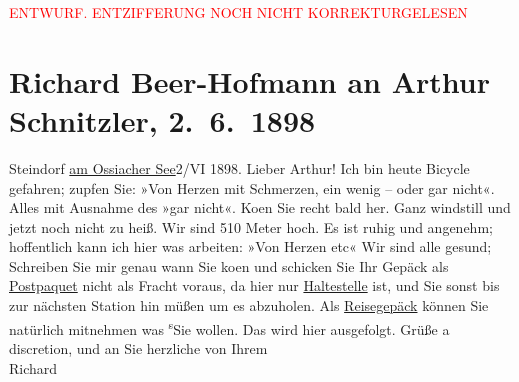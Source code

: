 
\begin{center}
            \textcolor{red}{ENTWURF. ENTZIFFERUNG NOCH NICHT KORREKTURGELESEN}
                      \end{center}
            
               \section[Richard Beer-Hofmann an Arthur Schnitzler, 2. 6. 1898]{ Richard Beer-Hofmann an Arthur Schnitzler, 2. 6. 1898}\nopagebreak{}\rehead{ }\begin{ledgroupsized}[t]{13cm}\normalsize\beginnumbering{} \toendnotes[C]{\smallbreak\pagebreak[2]} 
\pstart
           \raggedleft{}{\pb}Steindorf \uline{am Ossiacher
                        See}2/VI 1898.\pend
           \pstart
           Lieber Arthur! Ich bin heute Bicycle gefahren; zupfen Sie: »Von
               Herzen mit Schmerzen, ein wenig – oder gar nicht«. Alles mit Ausnahme des »gar
               nicht«. Ko{\geminationm}en Sie recht bald her. Ganz windstill und
               jetzt noch nicht zu heiß. Wir sind 510 Meter hoch. Es ist ruhig und ange{\pb}nehm; hoffentlich kann ich hier was
               arbeiten: »Von Herzen etc«\pend
           \pstart
           Wir sind alle gesund; Schreiben Sie mir genau wann Sie ko{\geminationm}en und schicken Sie Ihr Gepäck als \uline{Postpaquet} nicht
               als Fracht voraus, da hier nur \uline{Haltestelle} ist, und
               Sie sonst bis zur nächsten Station {\pb} hin müßen um es abzuholen. Als \uline{Reisegepäck} können Sie natürlich mitnehmen was \substVorne{}\textsuperscript{s}\substDazwischen{}S\substHinten{}ie wollen. Das wird hier ausgefolgt. Grüße a discretion, und an Sie herzliche
               von\pend
           \pstart
           Ihrem{\\}Richard\pend
           \endnumbering{}\end{ledgroupsized}  \newcommand{\dateiname}{L00799}\newcommand{\titel}{Richard Beer-Hofmann an Arthur Schnitzler, 2. 6. 1898}\newcommand{\editorInnen}{Martin Anton Müller und Gerd-Hermann Susen}
      